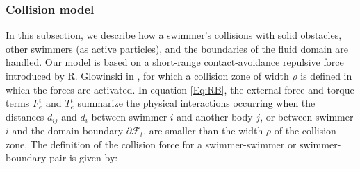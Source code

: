\documentclass[graybox]{svmult}
\newcommand{\Fluid}{\mathcal{F}} %
\newcommand{\Alemap}{\mathcal{A}} %
\newcommand{\ALE}{ALE} %
\newcommand{\Vel}{u} %
\newcommand{\tvel}{U} %
\newcommand{\angvel}{\omega} %
\newcommand{\CenterMass}{x^{CM}} %
\newcommand{\Solid}{\mathcal{S}} %
\begin{document}



\subsubsection{Collision model} 
\label{rigidcollision}

In this subsection, we describe how a swimmer's collisions with solid obstacles, other swimmers (as active particles), and the boundaries of the fluid domain are handled. Our model is based on a short-range contact-avoidance repulsive force introduced by R. Glowinski in \cite{glowinski}, for which a collision zone of width $\rho$ is defined in which the forces are activated.
In equation \eqref{Eq:RB}, the external force and torque terms $F_e^i$ and $T_e^i$ summarize the physical interactions occurring when the distances $d_{ij}$ and $d_{i}$ between swimmer $i$ and another body $j$, or between swimmer $i$ and the domain boundary $\partial \Fluid_t$, are smaller than the width $\rho$ of the collision zone.  
The definition of the collision force for a swimmer-swimmer or swimmer-boundary pair is given by: 
\end{document}
